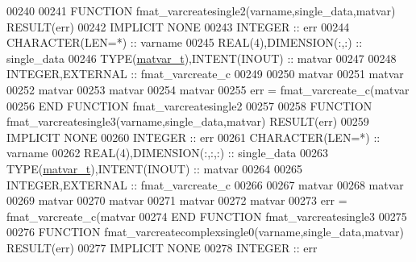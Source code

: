 \begin{DoxyCode}
00240 
00241 \textcolor{keyword}{FUNCTION }fmat\_varcreatesingle2(varname,single\_data,matvar) \textcolor{keyword}{RESULT}(err)
00242 \textcolor{keywordtype}{IMPLICIT NONE}
00243     \textcolor{keywordtype}{INTEGER}                         :: err
00244     \textcolor{keywordtype}{CHARACTER(LEN=*)}                :: varname
00245     \textcolor{keywordtype}{REAL(4)},\textcolor{keywordtype}{DIMENSION(:,:)} :: single\_data
00246     \textcolor{keywordtype}{TYPE}(\hyperlink{group___m_a_t_structmatvar__t}{matvar\_t}),\textcolor{keywordtype}{INTENT(INOUT)}    :: matvar
00247 
00248     \textcolor{keywordtype}{INTEGER},\textcolor{keywordtype}{EXTERNAL}                :: fmat\_varcreate\_c
00249 
00250     matvar%
00251     matvar%
00252     matvar%
00253     matvar%
00254     matvar%
00255     err = fmat\_varcreate\_c(matvar%
00256 \textcolor{keyword}{END FUNCTION }fmat\_varcreatesingle2
00257 
00258 \textcolor{keyword}{FUNCTION }fmat\_varcreatesingle3(varname,single\_data,matvar) \textcolor{keyword}{RESULT}(err)
00259 \textcolor{keywordtype}{IMPLICIT NONE}
00260     \textcolor{keywordtype}{INTEGER}                         :: err
00261     \textcolor{keywordtype}{CHARACTER(LEN=*)}                :: varname
00262     \textcolor{keywordtype}{REAL(4)},\textcolor{keywordtype}{DIMENSION(:,:,:)} :: single\_data
00263     \textcolor{keywordtype}{TYPE}(\hyperlink{group___m_a_t_structmatvar__t}{matvar\_t}),\textcolor{keywordtype}{INTENT(INOUT)}    :: matvar
00264 
00265     \textcolor{keywordtype}{INTEGER},\textcolor{keywordtype}{EXTERNAL}                :: fmat\_varcreate\_c
00266 
00267     matvar%
00268     matvar%
00269     matvar%
00270     matvar%
00271     matvar%
00272     matvar%
00273     err = fmat\_varcreate\_c(matvar%
00274 \textcolor{keyword}{END FUNCTION }fmat\_varcreatesingle3
00275 
00276 \textcolor{keyword}{FUNCTION }fmat\_varcreatecomplexsingle0(varname,single\_data,matvar) \textcolor{keyword}{RESULT}(err)
00277 \textcolor{keywordtype}{IMPLICIT NONE}
00278     \textcolor{keywordtype}{INTEGER}                         :: err

\end{DoxyCode}
